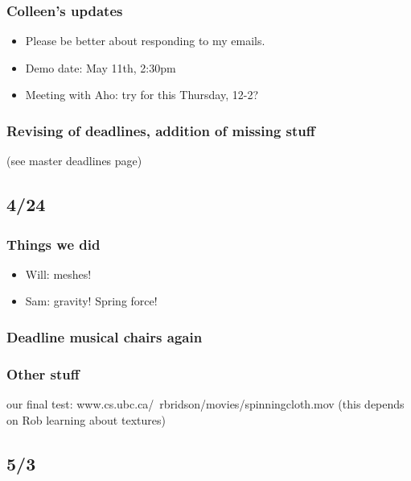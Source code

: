 \subsubsection*{Colleen's updates}
\begin{itemize}
\item Please be better about responding to my emails.
\item Demo date: May 11th, 2:30pm
\item Meeting with Aho: try for this Thursday, 12-2?
\end{itemize}

\subsubsection*{Revising of deadlines, addition of missing stuff}
(see master deadlines page)

\subsection*{4/24}

\subsubsection*{Things we did}
\begin{itemize}
\item Will: meshes!
\item Sam: gravity! Spring force!
\end{itemize}

\subsubsection*{Deadline musical chairs again}

\subsubsection*{Other stuff}
our final test: www.cs.ubc.ca/~rbridson/movies/spinningcloth.mov
(this depends on Rob learning about textures)

\subsection*{5/3}

